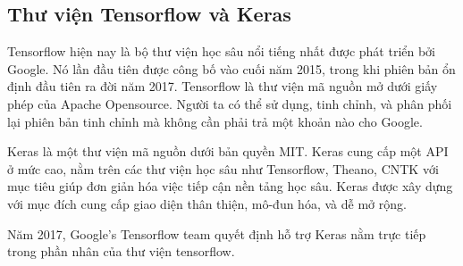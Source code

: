 \subsection{Thư viện Tensorflow và Keras}

Tensorflow hiện nay là bộ thư viện học sâu nổi tiếng nhất được phát triển bởi Google. Nó lần đầu tiên được công bố vào cuối năm 2015, trong khi phiên bản ổn định đầu tiên ra đời năm 2017. Tensorflow là thư viện mã nguồn mở dưới giấy phép của Apache Opensource. Người ta có thể sử dụng, tinh chỉnh, và phân phối lại phiên bản tinh chỉnh mà không cần phải trả một khoản nào cho Google.

Keras là một thư viện mã nguồn dưới bản quyền MIT. Keras cung cấp một API ở mức cao, nằm trên các thư viện học sâu như Tensorflow, Theano, CNTK với mục tiêu giúp đơn giản hóa việc tiếp cận nền tảng học sâu. Keras được xây dựng với mục đích cung cấp giao diện thân thiện, mô-đun hóa, và dễ mở rộng.

Năm 2017, Google’s Tensorflow team quyết định hỗ trợ Keras nằm trực tiếp trong phần nhân của thư viện tensorflow.
